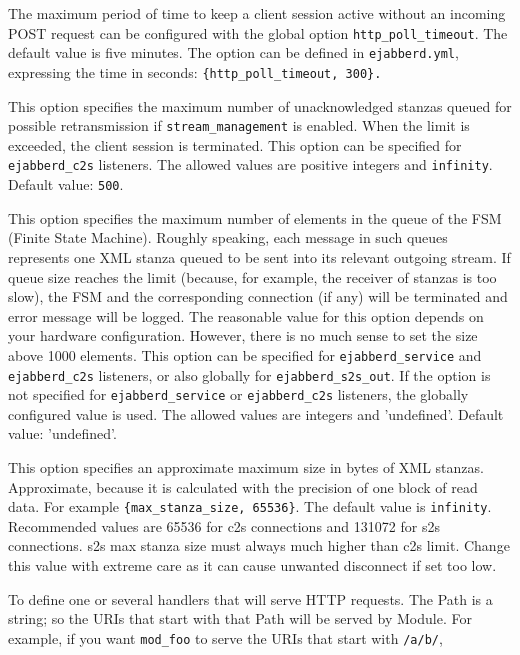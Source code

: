 \documentclass[a4paper,10pt]{book}
\newcommand{\ind}[1]{\begin{latexonly}\index{#1}\end{latexonly}}
\newcommand{\bracehack}{\def\{{\char"7B}\def\}{\char"7D}}
\newcommand{\titem}[1]{\item[\bracehack\texttt{#1}]}
\newcommand{\term}[1]{\texttt{#1}}
\begin{document}
\begin{description}
    The maximum period of time to keep a client session active without
    an incoming POST request can be configured with the global option
    \term{http\_poll\_timeout}. The default value is five minutes.
    The option can be defined in \term{ejabberd.yml}, expressing the time
    in seconds: \verb|{http_poll_timeout, 300}.|
  \titem{max\_ack\_queue: Size}
    This option specifies the maximum number of unacknowledged stanzas
    queued for possible retransmission if \term{stream\_management} is
    enabled. When the limit is exceeded, the client session is
    terminated. This option can be specified for \term{ejabberd\_c2s}
    listeners. The allowed values are positive integers and
    \term{infinity}. Default value: \term{500}.
  \titem{max\_fsm\_queue: Size}
    This option specifies the maximum number of elements in the queue of the FSM
    (Finite State Machine).
    Roughly speaking, each message in such queues represents one XML
    stanza queued to be sent into its relevant outgoing stream. If queue size
    reaches the limit (because, for example, the receiver of stanzas is too slow),
    the FSM and the corresponding connection (if any) will be terminated
    and error message will be logged.
    The reasonable value for this option depends on your hardware configuration.
    However, there is no much sense to set the size above 1000 elements.
    This option can be specified for \term{ejabberd\_service} and
    \term{ejabberd\_c2s} listeners,
    or also globally for \term{ejabberd\_s2s\_out}.
    If the option is not specified for \term{ejabberd\_service} or
    \term{ejabberd\_c2s} listeners,
    the globally configured value is used.
    The allowed values are integers and 'undefined'.
    Default value: 'undefined'.
  \titem{max\_stanza\_size: Size}
    \ind{options!max\_stanza\_size}This option specifies an
    approximate maximum size in bytes of XML stanzas.  Approximate,
    because it is calculated with the precision of one block of read
    data. For example \verb|{max_stanza_size, 65536}|.  The default
    value is \term{infinity}. Recommended values are 65536 for c2s
    connections and 131072 for s2s connections. s2s max stanza size
    must always much higher than c2s limit. Change this value with
    extreme care as it can cause unwanted disconnect if set too low.
  \titem{request\_handlers: \{Path: Module\}} To define one or several handlers that will serve HTTP requests.
    The Path is a string; so the URIs that start with that Path will be served by Module.
    For example, if you want \term{mod\_foo} to serve the URIs that start with \term{/a/b/},

\end{description}
\end{document}
